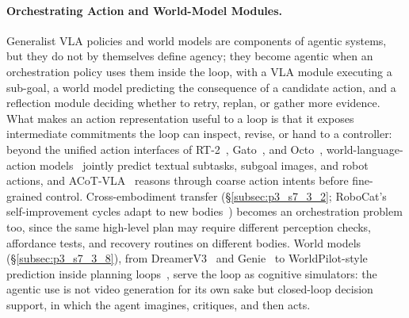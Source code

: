 \paragraph{Orchestrating Action and World-Model Modules.}
Generalist VLA policies and world models are components of agentic systems, but they do not by themselves define agency; they become agentic when an orchestration policy uses them inside the loop, with a VLA module executing a sub-goal, a world model predicting the consequence of a candidate action, and a reflection module deciding whether to retry, replan, or gather more evidence.
What makes an action representation useful to a loop is that it exposes intermediate commitments the loop can inspect, revise, or hand to a controller: beyond the unified action interfaces of RT-2~\cite{zitkovich2023rt2}, Gato~\cite{reed2022generalist}, and Octo~\cite{team2024octo}, world-language-action models~\cite{yang2026wla} jointly predict textual subtasks, subgoal images, and robot actions, and ACoT-VLA~\cite{zhong2026acotvla} reasons through coarse action intents before fine-grained control.
Cross-embodiment transfer (§\ref{subsec:p3_s7_3_2}; RoboCat's self-improvement cycles adapt to new bodies~\cite{bousmalis2023robocat}) becomes an orchestration problem too, since the same high-level plan may require different perception checks, affordance tests, and recovery routines on different bodies.
World models (§\ref{subsec:p3_s7_3_8}), from DreamerV3~\cite{hafner2023mastering} and Genie~\cite{genie3} to WorldPilot-style prediction inside planning loops~\cite{lin2026worldpilot}, serve the loop as cognitive simulators: the agentic use is not video generation for its own sake but closed-loop decision support, in which the agent imagines, critiques, and then acts.





